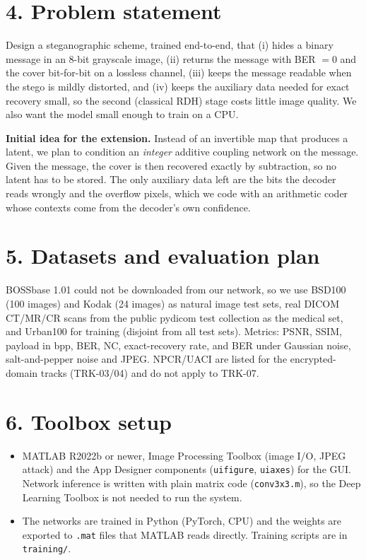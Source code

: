 \documentclass[10pt,a4paper]{article}
\begin{document}
\section*{4. Problem statement}
Design a steganographic scheme, trained end-to-end, that (i) hides a binary message in an 8-bit grayscale image,
(ii) returns the message with BER $= 0$ and the cover bit-for-bit on a lossless channel, (iii) keeps the message
readable when the stego is mildly distorted, and (iv) keeps the auxiliary data needed for exact recovery small, so the
second (classical RDH) stage costs little image quality. We also want the model small enough to train on a CPU.

\textbf{Initial idea for the extension.} Instead of an invertible map that produces a latent, we plan to condition an
\emph{integer} additive coupling network on the message. Given the message, the cover is then recovered exactly by
subtraction, so no latent has to be stored. The only auxiliary data left are the bits the decoder reads wrongly and
the overflow pixels, which we code with an arithmetic coder whose contexts come from the decoder's own confidence.

\section*{5. Datasets and evaluation plan}
BOSSbase 1.01 could not be downloaded from our network, so we use BSD100 (100 images) and Kodak (24 images) as natural
image test sets, real DICOM CT/MR/CR scans from the public pydicom test collection as the medical set, and Urban100 for
training (disjoint from all test sets). Metrics: PSNR, SSIM, payload in bpp, BER, NC, exact-recovery rate, and BER under
Gaussian noise, salt-and-pepper noise and JPEG. NPCR/UACI are listed for the encrypted-domain tracks (TRK-03/04) and
do not apply to TRK-07.

\section*{6. Toolbox setup}
\begin{itemize}
\item MATLAB R2022b or newer, Image Processing Toolbox (image I/O, JPEG attack) and the App Designer components
(\texttt{uifigure}, \texttt{uiaxes}) for the GUI. Network inference is written with plain matrix code
(\texttt{conv3x3.m}), so the Deep Learning Toolbox is not needed to run the system.
\item The networks are trained in Python (PyTorch, CPU) and the weights are exported to \texttt{.mat} files that
MATLAB reads directly. Training scripts are in \texttt{training/}.
\end{itemize}
\end{document}
